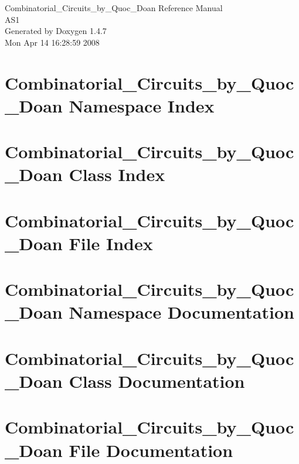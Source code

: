 \documentclass[a4paper]{book}
\begin{document}
\begin{titlepage}
\vspace*{7cm}
\begin{center}
{\Large Combinatorial\_\-Circuits\_\-by\_\-Quoc\_\-Doan Reference Manual\\[1ex]\large AS1 }\\
\vspace*{1cm}
{\large Generated by Doxygen 1.4.7}\\
\vspace*{0.5cm}
{\small Mon Apr 14 16:28:59 2008}\\
\end{center}
\end{titlepage}
\clearemptydoublepage
{}
\tableofcontents
\clearemptydoublepage
{}
\chapter{Combinatorial\_\-Circuits\_\-by\_\-Quoc\_\-Doan Namespace Index}

\chapter{Combinatorial\_\-Circuits\_\-by\_\-Quoc\_\-Doan Class Index}

\chapter{Combinatorial\_\-Circuits\_\-by\_\-Quoc\_\-Doan File Index}

\chapter{Combinatorial\_\-Circuits\_\-by\_\-Quoc\_\-Doan Namespace Documentation}

\chapter{Combinatorial\_\-Circuits\_\-by\_\-Quoc\_\-Doan Class Documentation}





\chapter{Combinatorial\_\-Circuits\_\-by\_\-Quoc\_\-Doan File Documentation}






\printindex
\end{document}
